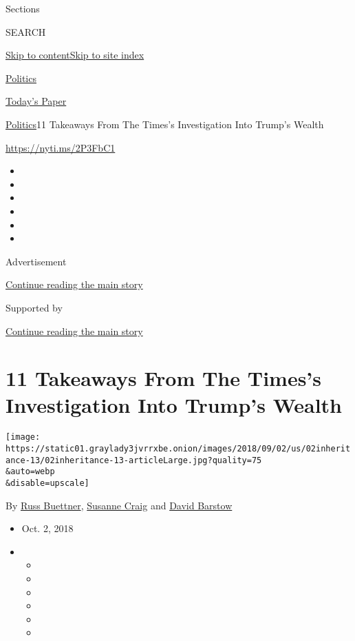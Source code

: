 Sections

SEARCH

\protect\hyperlink{site-content}{Skip to
content}\protect\hyperlink{site-index}{Skip to site index}

\href{https://www.nytimes3xbfgragh.onion/section/politics}{Politics}

\href{https://myaccount.nytimes3xbfgragh.onion/auth/login?response_type=cookie\&client_id=vi}{}

\href{https://www.nytimes3xbfgragh.onion/section/todayspaper}{Today's
Paper}

\href{/section/politics}{Politics}\textbar{}11 Takeaways From The
Times's Investigation Into Trump's Wealth

\url{https://nyti.ms/2P3FbC1}

\begin{itemize}
\item
\item
\item
\item
\item
\item
\end{itemize}

Advertisement

\protect\hyperlink{after-top}{Continue reading the main story}

Supported by

\protect\hyperlink{after-sponsor}{Continue reading the main story}

\hypertarget{11-takeaways-from-the-timess-investigation-into-trumps-wealth}{%
\section{11 Takeaways From The Times's Investigation Into Trump's
Wealth}\label{11-takeaways-from-the-timess-investigation-into-trumps-wealth}}

\texttt{[image: https://static01.graylady3jvrrxbe.onion/images/2018/09/02/us/02inheritance-13/02inheritance-13-articleLarge.jpg?quality=75\\\&auto=webp\\\&disable=upscale]}

By \href{https://www.nytimes3xbfgragh.onion/by/russ-buettner}{Russ
Buettner},
\href{https://www.nytimes3xbfgragh.onion/by/susanne-craig}{Susanne
Craig} and
\href{https://www.nytimes3xbfgragh.onion/by/david-barstow}{David
Barstow}

\begin{itemize}
\item
  Oct. 2, 2018
\item
  \begin{itemize}
  \item
  \item
  \item
  \item
  \item
  \item
  \end{itemize}
\end{itemize}

